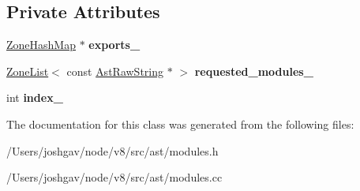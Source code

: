 \subsection*{Private Attributes}
\begin{DoxyCompactItemize}
\item 
\hyperlink{classv8_1_1internal_1_1_template_hash_map_impl}{Zone\+Hash\+Map} $\ast$ {\bfseries exports\+\_\+}\hypertarget{classv8_1_1internal_1_1_module_descriptor_ab4be10941ec05036a81d5f935662c64a}{}\label{classv8_1_1internal_1_1_module_descriptor_ab4be10941ec05036a81d5f935662c64a}

\item 
\hyperlink{classv8_1_1internal_1_1_zone_list}{Zone\+List}$<$ const \hyperlink{classv8_1_1internal_1_1_ast_raw_string}{Ast\+Raw\+String} $\ast$ $>$ {\bfseries requested\+\_\+modules\+\_\+}\hypertarget{classv8_1_1internal_1_1_module_descriptor_a8ee74d1ee3023dbe182eed14bd206546}{}\label{classv8_1_1internal_1_1_module_descriptor_a8ee74d1ee3023dbe182eed14bd206546}

\item 
int {\bfseries index\+\_\+}\hypertarget{classv8_1_1internal_1_1_module_descriptor_a02458890dbe0267a418c63fe1759d70f}{}\label{classv8_1_1internal_1_1_module_descriptor_a02458890dbe0267a418c63fe1759d70f}

\end{DoxyCompactItemize}


The documentation for this class was generated from the following files\+:\begin{DoxyCompactItemize}
\item 
/\+Users/joshgav/node/v8/src/ast/modules.\+h\item 
/\+Users/joshgav/node/v8/src/ast/modules.\+cc\end{DoxyCompactItemize}
